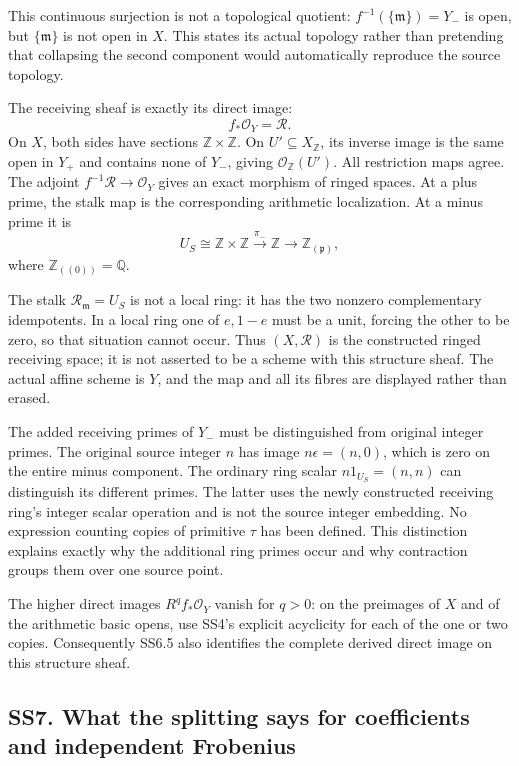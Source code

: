This continuous surjection is not a topological quotient:
\(f^{-1}(\{\mathfrak m\})=Y_-\) is open, but \(\{\mathfrak m\}\) is not
open in \(X\). This states its actual topology rather than pretending
that collapsing the second component would automatically reproduce the
source topology.

The receiving sheaf is exactly its direct image: \[
 \boxed{f_*\mathcal O_Y=\mathcal R.}
\tag{SS6.5}
\] On \(X\), both sides have sections \(\mathbb Z\times\mathbb Z\). On
\(U'\subseteq X_{\mathbb Z}\), its inverse image is the same open in
\(Y_+\) and contains none of \(Y_-\), giving
\(\mathcal O_{\mathbb Z}(U')\). All restriction maps agree. The adjoint
\(f^{-1}\mathcal R\to\mathcal O_Y\) gives an exact morphism of ringed
spaces. At a plus prime, the stalk map is the corresponding arithmetic
localization. At a minus prime it is \[
 U_S\cong\mathbb Z\times\mathbb Z
 \xrightarrow{\pi_-}\mathbb Z
 \longrightarrow\mathbb Z_{(\mathfrak p)},
\tag{SS6.6}
\] where \(\mathbb Z_{((0))}=\mathbb Q\).

The stalk \(\mathcal R_{\mathfrak m}=U_S\) is not a local ring: it has
the two nonzero complementary idempotents. In a local ring one of
\(e,1-e\) must be a unit, forcing the other to be zero, so that
situation cannot occur. Thus \((X,\mathcal R)\) is the constructed
ringed receiving space; it is not asserted to be a scheme with this
structure sheaf. The actual affine scheme is \(Y\), and the map and all
its fibres are displayed rather than erased.

The added receiving primes of \(Y_-\) must be distinguished from
original integer primes. The original source integer \(n\) has image
\(n\epsilon=(n,0)\), which is zero on the entire minus component. The
ordinary ring scalar \(n1_{U_S}=(n,n)\) can distinguish its different
primes. The latter uses the newly constructed receiving ring's integer
scalar operation and is not the source integer embedding. No expression
counting copies of primitive \(\tau\) has been defined. This distinction
explains exactly why the additional ring primes occur and why
contraction groups them over one source point.

The higher direct images \(R^qf_*\mathcal O_Y\) vanish for \(q>0\): on
the preimages of \(X\) and of the arithmetic basic opens, use SS4's
explicit acyclicity for each of the one or two copies. Consequently
SS6.5 also identifies the complete derived direct image on this
structure sheaf.

\subsection{SS7. What the splitting says for coefficients and
independent
Frobenius}\label{ss7.-what-the-splitting-says-for-coefficients-and-independent-frobenius}

